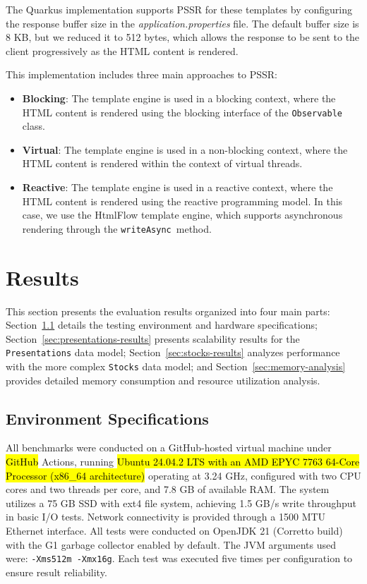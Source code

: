 \documentclass[software,article,accept,pdftex,moreauthors]{Definitions/mdpi}
\begin{document}
The Quarkus implementation supports PSSR for these templates by configuring the
response buffer size in the \textit{application.properties} file. The default
buffer size is 8 KB, but we reduced it to 512 bytes, which allows the response
to be sent to the client progressively as the HTML content is rendered.

This implementation includes three main approaches to PSSR\@:
\begin{itemize}
      \item \textbf{Blocking}: The template engine is used in a blocking context,
            where the HTML content is rendered using the blocking interface of the
            \texttt{Observable} class.
      \item \textbf{Virtual}: The template engine is used in a non-blocking context,
            where the HTML content is rendered within the context of virtual threads.
      \item \textbf{Reactive}: The template engine is used in a reactive context,
            where the HTML content is rendered using the reactive programming model.
            In this case, we use the HtmlFlow template engine, which
            supports asynchronous rendering through the \texttt{writeAsync}~method.
\end{itemize}


\section{Results}\label{s5}

This section presents the evaluation results organized into four main parts:
Section~\ref{sec:environment} details the testing environment and hardware
specifications; Section~\ref{sec:presentations-results} presents scalability
results for the \texttt{Presentations} data model;
Section~\ref{sec:stocks-results} analyzes performance with the more complex
\texttt{Stocks} data model; and Section~\ref{sec:memory-analysis} provides
detailed memory consumption and resource utilization analysis.

\subsection{Environment Specifications}
\label{sec:environment}

All benchmarks were conducted on a GitHub-hosted virtual machine under \hl{GitHub} %
Actions, running \hl{Ubuntu 24.04.2 LTS with an AMD EPYC 7763 64-Core Processor
(x86\_64 architecture)} %
 operating at 3.24 GHz, configured with two CPU cores and two
threads per core, and 7.8 GB of available RAM. The system utilizes a 75 GB SSD
with ext4 file system, achieving 1.5 GB/s write throughput in basic I/O tests.
Network connectivity is provided through a 1500 MTU Ethernet interface. All
tests were conducted on OpenJDK 21 (Corretto build) with the G1 garbage
collector enabled by default. The JVM arguments used were: \texttt{-Xms512m
     -Xmx16g}. Each test was executed five times per configuration to ensure result
reliability.
\end{document}
